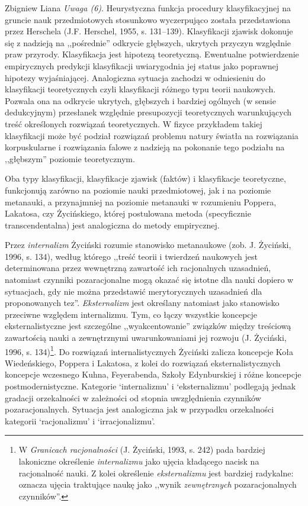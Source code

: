 \begin{artplenv}{Zbigniew Liana}
\textit{Uwaga (6)}. Heurystyczna funkcja procedury klasyfikacyjnej na gruncie nauk przedmiotowych stosunkowo wyczerpująco
została przedstawiona przez Herschela \label{ref:RND1u8fbCVzxR}(J.F. Herschel, 1955, s. 131–139). Klasyfikacji zjawisk
dokonuje się z nadzieją na ,,pośrednie'' odkrycie głębszych, ukrytych przyczyn względnie praw przyrody. Klasyfikacja jest
hipotezą teoretyczną. Ewentualne potwierdzenie empirycznych predykcji klasyfikacji uwiarygodnia jej status jako
poprawnej hipotezy wyjaśniającej. Analogiczna sytuacja zachodzi w odniesieniu do klasyfikacji teoretycznych czyli
klasyfikacji różnego typu teorii naukowych. Pozwala ona na odkrycie ukrytych, głębszych i bardziej ogólnych (w sensie
dedukcyjnym) przesłanek względnie presupozycji teoretycznych warunkujących treść określonych rozwiązań teoretycznych. W
fizyce przykładem takiej klasyfikacji może być podział rozwiązań problemu natury światła na rozwiązania korpuskularne i
rozwiązania falowe z nadzieją na pokonanie tego podziału na ,,głębszym'' poziomie teoretycznym.

Oba typy klasyfikacji, klasyfikacje zjawisk (faktów) i klasyfikacje teoretyczne, funkcjonują zarówno na poziomie nauki
przedmiotowej, jak i na poziomie metanauki, a przynajmniej na poziomie metanauki w rozumieniu Poppera, Lakatosa, czy
Życińskiego, której postulowana metoda (specyficznie transcendentalna) jest analogiczna do metody empirycznej.

Przez \textit{internalizm} Życiński rozumie stanowisko metanaukowe \label{ref:RNDCyQqUrHYuu}(zob. J. Życiński, 1996, s.
134), według którego ,,treść teorii i twierdzeń naukowych jest determinowana przez wewnętrzną zawartość ich racjonalnych
uzasadnień, natomiast czynniki pozaracjonalne mogą okazać się istotne dla nauki dopiero w sytuacjach, gdy nie można
przedstawić merytorycznych uzasadnień dla proponowanych tez''.  \textit{Eksternalizm} jest określany natomiast jako
stanowisko przeciwne względem internalizmu. Tym, co łączy wszystkie koncepcje eksternalistyczne jest szczególne
,,wyakcentowanie'' związków między treściową zawartością nauki a zewnętrznymi uwarunkowaniami jej rozwoju
\label{ref:RNDuAc97ED1Y1}(J. Życiński, 1996, s. 134)\footnote{W \textit{Granicach racjonalności}
	\label{ref:RND1EgQJ3J1nD}(J. Życiński, 1993, s. 242) pada bardziej lakoniczne określenie \textit{internalizmu} jako
	ujęcia kładącego nacisk na racjonalność nauki. Z kolei określenie \textit{eksternalizmu} jest bardziej radykalne: oznacza
	ujęcia traktujące naukę jako ,,wynik \textit{zewnętrznych} pozaracjonalnych czynników''.}. Do rozwiązań internalistycznych
Życiński zalicza koncepcje Koła Wiedeńskiego, Poppera i Lakatosa, z kolei do rozwiązań eksternalistycznych koncepcje
wczesnego Kuhna, Feyerabenda, Szkoły Edynburskiej i różne koncepcje postmodernistyczne. Kategorie ‘internalizmu’ i
‘eksternalizmu’ podlegają jednak gradacji orzekalności w zależności od stopnia uwzględnienia czynników
pozaracjonalnych. Sytuacja jest analogiczna jak w przypadku orzekalności kategorii ‘racjonalizmu’ i ‘irracjonalizmu’.


\end{artplenv}

